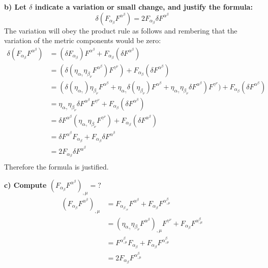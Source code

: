\documentclass[9pt]{report}
\begin{document}
\begin{enumerate}
  \textbf{b) Let $\delta$ indicate a variation or small change, and justify the
  formula:}
  \[
    \delta(F_\alpha_\beta F^\alpha^\beta) = 2 F_\alpha_\beta \delta F^\alpha^\beta
  \]
  The variation  will obey the product rule as follows and rembering that the variation of
  the metric components would be zero:
  \[
    \begin{align}
    \delta(F_\alpha_\beta F^\alpha^\beta) &= (\delta F_\alpha_\beta) F^\alpha^\beta + F_\alpha_\beta (\delta F^\alpha^\beta) \\
                                          &= (\delta (\eta_\alpha_\gamma \eta_\beta_\nu F^\alpha^\beta ) F^\gamma^\nu) + F_\alpha_\beta (\delta F^\alpha^\beta) \\
                                          &= (\delta (\eta_\alpha_\gamma) \eta_\beta_\nu F^\alpha^\beta + \eta_\alpha_\gamma \delta(\eta_\beta_\nu) F^\alpha^\beta + \eta_\alpha_\gamma \eta_\beta_\nu \delta F^\alpha^\beta  ) F^\gamma^\nu) + F_\alpha_\beta (\delta F^\alpha^\beta) \\
                                          &= \eta_\alpha_\gamma \eta_\beta_\nu \delta F^\alpha^\beta  F^\gamma^\nu + F_\alpha_\beta (\delta F^\alpha^\beta) \\
                                          &= \delta F^\alpha^\beta (\eta_\alpha_\gamma \eta_\beta_\nu  F^\gamma^\nu) + F_\alpha_\beta (\delta F^\alpha^\beta) \\
                                          &= \delta F^\alpha^\beta F_\alpha_\beta + F_\alpha_\beta \delta F^\alpha^\beta \\
                                          &= 2 F_\alpha_\beta \delta F^\alpha^\beta \\
  \end{align}
  \]
  Therefore the formula is justified.

  \textbf{c) Compute $(F_\alpha_\beta F^\alpha^\beta)_{,\mu} = ?$}
  \[
    \begin{align}
    (F_\alpha_\beta F^\alpha^\beta)_{,\mu} &= F_\alpha_\beta_{,\mu} F^\alpha^\beta + F_\alpha_\beta F^\alpha^\beta_{,\mu} \\
                                           &= (\eta_\alpha_\gamma \eta_\beta_\nu F^\alpha^\beta)_{,\mu} F^\gamma^\nu + F_\alpha_\beta F^\alpha^\beta_{,\mu} \\
                                           &= F^\alpha^\beta_{,\mu} F_\alpha_\beta + F_\alpha_\beta F^\alpha^\beta_{,\mu} \\
                                           &= 2F_\alpha_\beta F^\alpha^\beta_{,\mu} \\
    \end{align}
  \]
\end{enumerate}
\end{document}
